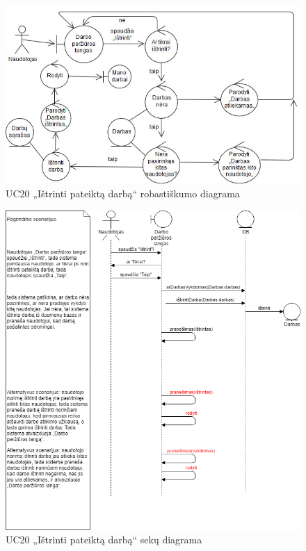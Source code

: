 \documentclass{VUMIFPSbakalaurinis}
\begin{document}
\begin{figure}[H]
	\centering
	\includegraphics[scale=0.6]{img/Robustness/UC20}
	\caption{UC20 „Ištrinti pateiktą darbą“ robastiškumo diagrama}
	\label{img:uc20rob}
\end{figure}

\begin{figure}[H]
	\centering
	\includegraphics[scale=0.6]{img/Sequence/SD20}
	\caption{UC20 „Ištrinti pateiktą darbą“ sekų diagrama}
	\label{img:uc20seq}
\end{figure}
\end{document}
